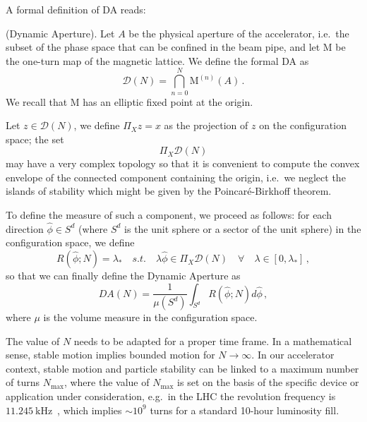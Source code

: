 A formal definition of DA reads:
\begin{definition}
	(Dynamic Aperture). Let \(A\) be the physical aperture of the accelerator, i.e.\ the subset of the phase space that can be confined in the beam pipe, and let \(\mathrm{M}\) be the one-turn map of the magnetic lattice. We define the formal DA as
	\begin{equation}
		\mathcal{D}(N)=\bigcap_{n=0}^N \mathrm{M}^{(n)}(A)\,.
	\end{equation}
	We recall that \(\mathrm{M}\) has an elliptic fixed point at the origin.

	Let \(z\in \mathcal{D}(N)\), we define \(\Pi_X z=x\) as the projection of \(z\) on the configuration space; the set
	\begin{equation}
		\Pi_X\mathcal{D}(N)
	\end{equation}
	may have a very complex topology so that it is convenient to compute the convex envelope of the connected component containing the origin, i.e.\ we neglect the islands of stability which might be given by the Poincaré-Birkhoff theorem.

	To define the measure of such a component, we proceed as follows: for each direction \(\hat \phi\in S^d\)  (where \(S^d\) is the unit sphere or a sector of the unit sphere) in the configuration space, we define
	\begin{equation}
	    R(\hat \phi; N)=\lambda_\ast\quad s.t.\quad \lambda \hat\phi\in \Pi_X \mathcal{D}(N)\quad \forall \quad \lambda\in[0,\lambda_\ast]\,,
	    \label{eq:ideal-R}
	\end{equation}
	so that we can finally define the Dynamic Aperture as
	\begin{equation}
        DA(N)=\frac{1}{\mu(S^d)}\int_{S^d} R(\hat \phi; N)d\hat\phi\,,
        \label{eq:formal_da}
	\end{equation}
	where \(\mu\) is the volume measure in the configuration space.
	\label{def:dynamic_aperture}
\end{definition}

The value of \(N\) needs to be adapted for a proper time frame. In a mathematical sense, stable motion implies bounded motion for \(N\rightarrow\infty\). In our accelerator context, stable motion and particle stability can be linked to a maximum number of turns \(N_{\text{max}}\), where the value of \(N_{\text{max}}\) is set on the basis of the specific device or application under consideration, e.g.\ in the LHC the revolution frequency is \(\SI{11.245}{\kHz}\)~\cite{lhc:faqs}, which implies \(\sim 10^9\) turns for a standard 10-hour luminosity fill.

